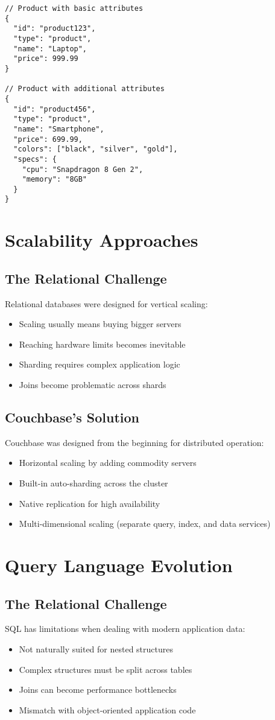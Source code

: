 \begin{verbatim}
// Product with basic attributes
{
  "id": "product123",
  "type": "product",
  "name": "Laptop",
  "price": 999.99
}

// Product with additional attributes
{
  "id": "product456",
  "type": "product",
  "name": "Smartphone",
  "price": 699.99,
  "colors": ["black", "silver", "gold"],
  "specs": {
    "cpu": "Snapdragon 8 Gen 2",
    "memory": "8GB"
  }
}
\end{verbatim}

\section{Scalability Approaches}

\subsection{The Relational Challenge}
Relational databases were designed for vertical scaling:
\begin{itemize}
  \item Scaling usually means buying bigger servers
  \item Reaching hardware limits becomes inevitable
  \item Sharding requires complex application logic
  \item Joins become problematic across shards
\end{itemize}

\subsection{Couchbase's Solution}
Couchbase was designed from the beginning for distributed operation:
\begin{itemize}
  \item Horizontal scaling by adding commodity servers
  \item Built-in auto-sharding across the cluster
  \item Native replication for high availability
  \item Multi-dimensional scaling (separate query, index, and data services)
\end{itemize}

\section{Query Language Evolution}

\subsection{The Relational Challenge}
SQL has limitations when dealing with modern application data:
\begin{itemize}
  \item Not naturally suited for nested structures
  \item Complex structures must be split across tables
  \item Joins can become performance bottlenecks
  \item Mismatch with object-oriented application code
\end{itemize}


